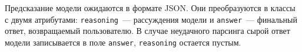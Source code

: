 Предсказание модели ожидаются в формате JSON.
Они преобразуются в классы с двумя атрибутами:
\texttt{reasoning}~--- рассуждения модели и
\texttt{answer}~--- финальный ответ, возвращаемый пользователю.
В случае неудачного парсинга сырой ответ модели записывается в поле
\texttt{answer}, \texttt{reasoning} остается пустым.
